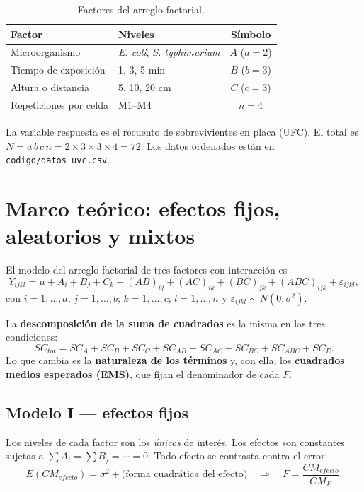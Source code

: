 \documentclass[12pt,a4paper]{article}
\begin{document}
\begin{table}[H]
\centering
\caption{Factores del arreglo factorial.}
\begin{tabular}{llc}
\toprule
\textbf{Factor} & \textbf{Niveles} & \textbf{Símbolo}\\
\midrule
Microorganismo & \textit{E. coli}, \textit{S. typhimurium} & $A$ ($a=2$)\\
Tiempo de exposición & 1, 3, 5 min & $B$ ($b=3$)\\
Altura o distancia & 5, 10, 20 cm & $C$ ($c=3$)\\
Repeticiones por celda & M1--M4 & $n=4$\\
\bottomrule
\end{tabular}
\end{table}

La variable respuesta es el recuento de sobrevivientes en placa (UFC). El total es $N=a\,b\,c\,n=2\times3\times3\times4=72$. Los datos ordenados están en \texttt{codigo/datos\_uvc.csv}.

\section{Marco teórico: efectos fijos, aleatorios y mixtos}

El modelo del arreglo factorial de tres factores con interacción es
\begin{equation}
Y_{ijkl} = \mu + A_i + B_j + C_k + (AB)_{ij} + (AC)_{ik} + (BC)_{jk} + (ABC)_{ijk} + \varepsilon_{ijkl},
\label{eq:modelo}
\end{equation}
con $i=1,\dots,a$; $j=1,\dots,b$; $k=1,\dots,c$; $l=1,\dots,n$ y $\varepsilon_{ijkl}\sim N(0,\sigma^2)$.

La \textbf{descomposición de la suma de cuadrados} es la misma en las tres condiciones:
\[
SC_{tot}=SC_A+SC_B+SC_C+SC_{AB}+SC_{AC}+SC_{BC}+SC_{ABC}+SC_E .
\]
Lo que cambia es la \textbf{naturaleza de los términos} y, con ella, los \textbf{cuadrados medios esperados (EMS)}, que fijan el denominador de cada $F$.

\subsection{Modelo I --- efectos fijos}

Los niveles de cada factor son los \emph{únicos} de interés. Los efectos son constantes sujetas a $\sum A_i=\sum B_j=\cdots=0$. Todo efecto se contrasta contra el error:
\[
E(CM_{efecto})=\sigma^2+\text{(forma cuadrática del efecto)}
\quad\Rightarrow\quad
F=\frac{CM_{efecto}}{CM_{E}} .
\]
\end{document}
